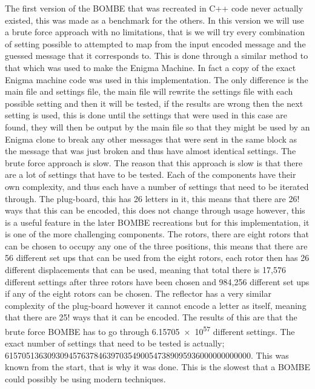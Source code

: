 \documentclass[12pt,a4paper]{article}
\begin{document}
The first version of the BOMBE that was recreated in C++ code never actually existed, this was made as a benchmark for the others. In this version we will use a brute force approach with no limitations, that is we will try every combination of setting possible to attempted to map from the input encoded message and the guessed message that it corresponds to. This is done through a similar method to that which was used to make the Enigma Machine. In fact a copy of the exact Enigma machine code was used in this implementation. The only difference is the main file and settings file, the main file will rewrite the settings file with each possible setting and then it will be tested, if the results are wrong then the next setting is used, this is done until the settings that were used in this case are found, they will then be output by the main file so that they might be used by an Enigma clone to break any other messages that were sent in the same block as the message that was just broken and thus have almost identical settings. The brute force approach is slow. The reason that this approach is slow is that there are a lot of settings that have to be tested. Each of the components have their own complexity, and thus each have a number of settings that need to be iterated through. The plug-board, this has 26 letters in it, this means that there are 26! ways that this can be encoded, this does not change through usage however, this is a useful feature in the later BOMBE recreations but for this implementation, it is one of the more challenging components. The rotors, there are eight rotors that can be chosen to occupy any one of the three positions, this means that there are 56 different set ups that can be used from the eight rotors, each rotor then has 26 different displacements that can be used, meaning that total there is 17,576 different settings after three rotors have been chosen and 984,256 different set ups if any of the eight rotors can be chosen. The reflector has a very similar complexity of the plug-board however it cannot encode a letter as itself, meaning that there are 25! ways that it can be encoded. The results of this are that the brute force BOMBE has to go through \num{6.15705e57} different settings. The exact number of settings that need to be tested is actually; \num{6157051363093094576378463970354900547389095936000000000000}. This was known from the start, that is why it was done. This is the slowest that a BOMBE could possibly be using modern techniques. \\
\end{document}
